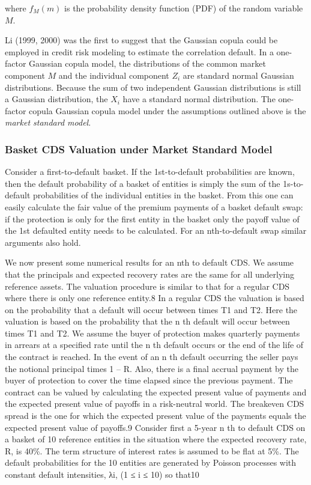 \documentclass[11pt]{article}
\begin{document}
where \(f_M(m)\) is the probability density function (PDF) of the random
variable \(M\).

Li (1999, 2000) was the first to suggest that the Gaussian copula could
be employed in credit risk modeling to estimate the correlation default.
In a one-factor Gaussian copula model, the distributions of the common
market component \(M\) and the individual component \(Z_i\) are standard
normal Gaussian distributions. Because the sum of two independent
Gaussian distributions is still a Gaussian distribution, the \(X_i\)
have a standard normal distribution. The one-factor copula Gaussian
copula model under the assumptions outlined above is the \emph{market
standard model}.

    \hypertarget{basket-cds-valuation-under-market-standard-model}{%
\subsubsection{Basket CDS Valuation under Market Standard
Model}\label{basket-cds-valuation-under-market-standard-model}}

Consider a first-to-default basket. If the 1st-to-default probabilities
are known, then the default probability of a basket of entities is
simply the sum of the 1s-to-default probabilities of the individual
entities in the basket. From this one can easily calculate the fair
value of the premium payments of a basket default swap: if the
protection is only for the first entity in the basket only the payoff
value of the 1st defaulted entity needs to be calculated. For an
nth-to-default swap similar arguments also hold.

We now present some numerical results for an nth to default CDS. We
assume that the principals and expected recovery rates are the same for
all underlying reference assets. The valuation procedure is similar to
that for a regular CDS where there is only one reference entity.8 In a
regular CDS the valuation is based on the probability that a default
will occur between times T1 and T2. Here the valuation is based on the
probability that the n th default will occur between times T1 and T2. We
assume the buyer of protection makes quarterly payments in arrears at a
specified rate until the n th default occurs or the end of the life of
the contract is reached. In the event of an n th default occurring the
seller pays the notional principal times 1 -- R. Also, there is a final
accrual payment by the buyer of protection to cover the time elapsed
since the previous payment. The contract can be valued by calculating
the expected present value of payments and the expected present value of
payoffs in a risk-neutral world. The breakeven CDS spread is the one for
which the expected present value of the payments equals the expected
present value of payoffs.9 Consider first a 5-year n th to default CDS
on a basket of 10 reference entities in the situation where the expected
recovery rate, R, is 40\%. The term structure of interest rates is
assumed to be flat at 5\%. The default probabilities for the 10 entities
are generated by Poisson processes with constant default intensities,
λi, (1 ≤ i ≤ 10) so that10
\end{document}
